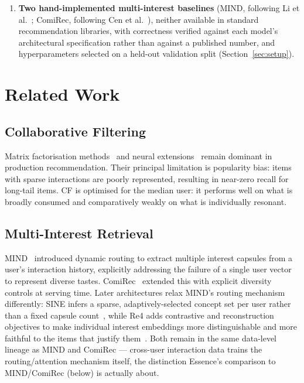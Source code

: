 \documentclass[11pt,a4paper]{article}
\begin{document}
\begin{enumerate}[leftmargin=*, itemsep=2pt]
{        resamples}, with the affected comparisons reported before and after.
        Computing $p$ from the fraction of strictly-positive resample
        differences treats exact ties as evidence against the null and
        reports $p=0$ for one-sided-with-ties differences --- the regime that
        sparse long-tail recall metrics routinely produce
        (Section~\ref{sec:stats-methodology}).
  \item \textbf{Two hand-implemented multi-interest baselines} (MIND,
        following Li et al.~\cite{li2019}; ComiRec, following Cen et
        al.~\cite{cen2020}), neither available in standard recommendation
        libraries, with correctness verified against each model's
        architectural specification rather than against a published number,
        and hyperparameters selected on a held-out validation split
        (Section~\ref{sec:setup}).
\end{enumerate}

\section{Related Work}
\label{sec:related}

\subsection{Collaborative Filtering}
\label{sec:cf}
Matrix factorisation methods~\cite{koren2009} and neural
extensions~\cite{he2017} remain dominant in production recommendation. Their
principal limitation is popularity bias: items with sparse interactions are
poorly represented, resulting in near-zero recall for long-tail items. CF is
optimised for the median user: it performs well on what is broadly consumed
and comparatively weakly on what is individually resonant.

\subsection{Multi-Interest Retrieval}
\label{subsec:multi}

MIND~\cite{li2019} introduced dynamic routing to extract multiple interest
capsules from a user's interaction history, explicitly addressing the failure
of a single user vector to represent diverse tastes. ComiRec~\cite{cen2020}
extended this with explicit diversity controls at serving time. Later
architectures relax MIND's routing mechanism differently: SINE infers a
sparse, adaptively-selected concept set per user rather than a fixed
capsule count~\cite{tan2021}, while Re4 adds contrastive and
reconstruction objectives to make individual interest embeddings more
distinguishable and more faithful to the items that justify
them~\cite{zhang2022}. Both remain in the same data-level lineage as
MIND and ComiRec --- cross-user interaction data trains the
routing/attention mechanism itself, the distinction Essence's comparison
to MIND/ComiRec (below) is actually about.
\end{document}
